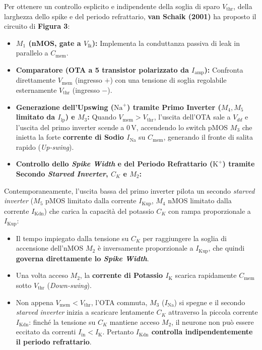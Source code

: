 \documentclass[11pt,a4paper]{article}
\begin{document}
Per ottenere un controllo esplicito e indipendente della soglia di sparo $V_{\text{thr}}$, della larghezza dello spike e del periodo refrattario, \textbf{van Schaik (2001)} ha proposto il circuito di \textbf{Figura 3}:
\begin{itemize}
  \item \textbf{$M_1$ (nMOS, gate a $V_{\text{lk}}$):} Implementa la conduttanza passiva di leak in parallelo a $C_{\text{mem}}$.
  \item \textbf{Comparatore (OTA a 5 transistor polarizzato da $I_{\text{amp}}$):} Confronta direttamente $V_{\text{mem}}$ (ingresso $+$) con una tensione di soglia regolabile esternamente \textbf{$V_{\text{thr}}$} (ingresso $-$).
  \item \textbf{Generazione dell'Upswing ($\text{Na}^+$) tramite Primo Inverter ($M_4, M_5$ limitato da $I_{\text{lp}}$) e $M_3$:} Quando $V_{\text{mem}} > V_{\text{thr}}$, l'uscita dell'OTA sale a $V_{dd}$ e l'uscita del primo inverter scende a $0\,\text{V}$, accendendo lo switch pMOS \textbf{$M_3$} che inietta la forte \textbf{corrente di Sodio $I_{\text{Na}}$} su $C_{\text{mem}}$, generando il fronte di salita rapido (\textit{Up-swing}).
  \item \textbf{Controllo dello \textit{Spike Width} e del Periodo Refrattario ($\text{K}^+$) tramite Secondo \textit{Starved Inverter}, $C_K$ e $M_2$:}
\end{itemize}
Contemporaneamente, l'uscita bassa del primo inverter pilota un secondo \textit{starved inverter} ($M_5$ pMOS limitato dalla corrente \textbf{$I_{\text{Kup}}$}, $M_4$ nMOS limitato dalla corrente \textbf{$I_{\text{Kdn}}$}) che carica la capacità del potassio \textbf{$C_K$} con rampa proporzionale a $I_{\text{Kup}}$:
\begin{itemize}
  \item Il tempo impiegato dalla tensione su $C_K$ per raggiungere la soglia di accensione dell'nMOS \textbf{$M_2$} è inversamente proporzionale a \textbf{$I_{\text{Kup}}$}, che quindi \textbf{governa direttamente lo \textit{Spike Width}}.
  \item Una volta acceso \textbf{$M_2$}, la \textbf{corrente di Potassio $I_{\text{K}}$} scarica rapidamente $C_{\text{mem}}$ sotto $V_{\text{thr}}$ (\textit{Down-swing}).
  \item Non appena $V_{\text{mem}} < V_{\text{thr}}$, l'OTA commuta, $M_3$ ($I_{\text{Na}}$) si spegne e il secondo \textit{starved inverter} inizia a scaricare lentamente $C_K$ attraverso la piccola corrente \textbf{$I_{\text{Kdn}}$}: finché la tensione su $C_K$ mantiene acceso $M_2$, il neurone non può essere eccitato da correnti $I_{\text{in}} < I_{\text{K}}$. Pertanto \textbf{$I_{\text{Kdn}}$ controlla indipendentemente il periodo refrattario}.
\end{itemize}
\end{document}

